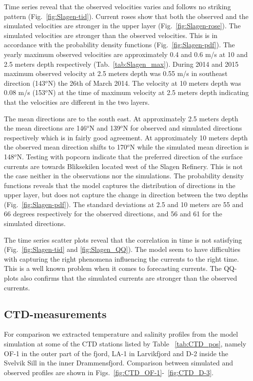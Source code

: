 Time series reveal that the observed velocities varies and follows no striking pattern (Fig.~\ref{fig:Slagen-tid}).
Current roses show that both the observed and the simulated velocities are stronger in the upper layer (Fig.~\ref{fig:Slagen-rose}). The simulated velocities are stronger than the observed velocities. This is in accordance with the probability density functions (Fig.~\ref{fig:Slagen-pdf}). The yearly maximum observed velocities are approximately 0.4 and 0.6 m/s at 10 and 2.5 meters depth respectively (Tab.~\ref{tab:Slagen_max}). During 2014 and 2015 maximum observed velocity at 2.5 meters depth was 0.55 m/s in southeast direction (143$^o$N) the 26th of March 2014. The velocity at 10 meters depth was 0.08 m/s (153$^o$N) at the time of maximum velocity at 2.5 meters depth indicating that the velocities are different in the two layers.

The mean directions are to the south east. At approximately 2.5 meters depth the mean directions are 146$^o$N and 139$^o$N for observed and simulated directions respectively which is in fairly good agreement. At approximately 10 meters depth the observed mean direction shifts to 170$^o$N while the simulated mean direction is 148$^o$N. 
Testing with popcorn indicate that the preferred direction of the surface currents are towards Bliksekilen located west of the Slagen Refinery. This is not the case neither in the observations nor the simulations.
The probability density functions reveals that the model captures the distribution of directions in the upper layer, but does not capture the change in direction between the two depths (Fig.~\ref{fig:Slagen-pdf}). The standard deviations at 2.5 and 10 meters are 55 and 66 degrees respectively for the observed directions, and 56 and 61 for the simulated directions.

The time series scatter plots reveal that the correlation in time is not satisfying (Fig.~\ref{fig:Slagen-tid} and \ref{fig:Slagen_QQ}). The model seem to have difficulties with capturing the right phenomena influencing the currents to the right time. This is a well known problem when it comes to forecasting currents. The QQ-plots also confirms that the simulated currents are stronger than the observed currents. 


\subsection{CTD-measurements}
\label{subsec:CTDe}
For comparison we extracted temperature and salinity profiles from the model simulation at some of the CTD stations listed by Table ~\ref{tab:CTD_pos}, namely OF-1 in the outer part of the fjord, LA-1 in Larvikfjord and D-2 inside the Svelvik Sill in the inner Drammensfjord. Comparison between simulated and observed profiles are shown in Figs.~\ref{fig:CTD_OF-1}-~\ref{fig:CTD_D-3}. 

